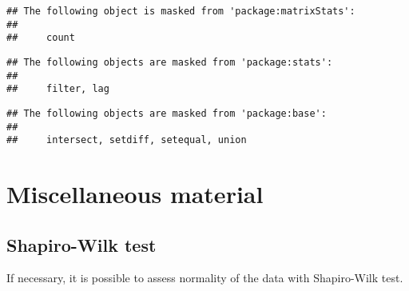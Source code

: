\documentclass[
  oneside]{book}
\newenvironment{Shaded}{\begin{snugshade}}{\end{snugshade}}
\newcommand{\CommentTok}[1]{\textcolor[rgb]{0.56,0.35,0.01}{\textit{#1}}}
\newcommand{\ControlFlowTok}[1]{\textcolor[rgb]{0.13,0.29,0.53}{\textbf{#1}}}
\newcommand{\FloatTok}[1]{\textcolor[rgb]{0.00,0.00,0.81}{#1}}
\newcommand{\FunctionTok}[1]{\textcolor[rgb]{0.00,0.00,0.00}{#1}}
\newcommand{\NormalTok}[1]{#1}
\newcommand{\OtherTok}[1]{\textcolor[rgb]{0.56,0.35,0.01}{#1}}
\newcommand{\SpecialCharTok}[1]{\textcolor[rgb]{0.00,0.00,0.00}{#1}}
\newcommand{\StringTok}[1]{\textcolor[rgb]{0.31,0.60,0.02}{#1}}
\begin{document}
\begin{verbatim}
## The following object is masked from 'package:matrixStats':
## 
##     count
\end{verbatim}

\begin{verbatim}
## The following objects are masked from 'package:stats':
## 
##     filter, lag
\end{verbatim}

\begin{verbatim}
## The following objects are masked from 'package:base':
## 
##     intersect, setdiff, setequal, union
\end{verbatim}

\hypertarget{miscellaneous-material}{%
\chapter{Miscellaneous material}\label{miscellaneous-material}}

\hypertarget{shapiro-wilk-test}{%
\section{Shapiro-Wilk test}\label{shapiro-wilk-test}}

If necessary, it is possible to assess normality of the data with Shapiro-Wilk test.

\begin{Shaded}
\end{Shaded}
\end{document}

